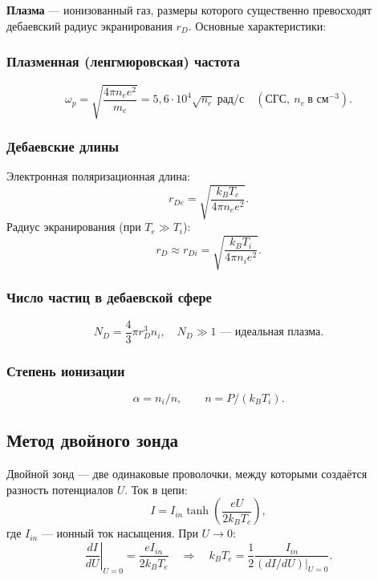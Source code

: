 \documentclass[a4paper]{article}
\begin{document}
	\textbf{Плазма} — ионизованный газ, размеры которого существенно превосходят дебаевский радиус экранирования $r_D$. Основные характеристики:
	
	\subsubsection{Плазменная (ленгмюровская) частота}
	\begin{equation}
		\omega_p = \sqrt{\frac{4\pi n_e e^2}{m_e}} = 5{,}6\cdot 10^4 \sqrt{n_e} \ \text{рад/с} \quad (\text{СГС}, \ n_e \ \text{в см}^{-3}).
		\label{eq:omega_p}
	\end{equation}
	
	\subsubsection{Дебаевские длины}
	Электронная поляризационная длина:
	\begin{equation}
		r_{De} = \sqrt{\frac{k_B T_e}{4\pi n_e e^2}}.
		\label{eq:rDe}
	\end{equation}
	Радиус экранирования (при $T_e \gg T_i$):
	\begin{equation}
		r_D \approx r_{Di} = \sqrt{\frac{k_B T_i}{4\pi n_i e^2}}.
		\label{eq:rD}
	\end{equation}
	
	\subsubsection{Число частиц в дебаевской сфере}
	\begin{equation}
		N_D = \frac{4}{3}\pi r_D^3 n_i, \quad N_D \gg 1 \text{ — идеальная плазма}.
		\label{eq:ND}
	\end{equation}
	
	\subsubsection{Степень ионизации}
	\begin{equation}
		\alpha = n_i / n, \qquad n = P/(k_B T_i).
	\end{equation}
	
	\subsection{Метод двойного зонда}
	
	Двойной зонд — две одинаковые проволочки, между которыми создаётся разность потенциалов $U$. Ток в цепи:
	\begin{equation}
		I = I_{in} \tanh\!\left(\frac{eU}{2k_BT_e}\right),
		\label{eq:double_probe}
	\end{equation}
	где $I_{in}$ — ионный ток насыщения. При $U \to 0$:
	\[
	\left.\frac{dI}{dU}\right|_{U=0} = \frac{e I_{in}}{2k_BT_e}
	\quad\Rightarrow\quad
	k_BT_e = \frac{1}{2}\frac{I_{in}}{(dI/dU)|_{U=0}}.
	\]
	
\end{document}
